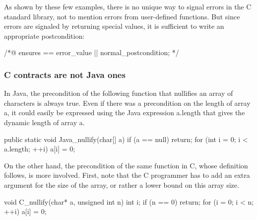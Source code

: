 As shown by these few examples, there is no unique way to signal
errors in the C standard library, not to mention errors from user-defined
functions. But since errors are signaled by returning special values, it
is sufficient to write an appropriate postcondition:

\begin{listing-nonumber}
/*@ ensures \result == error_value || normal_postcondition; */
\end{listing-nonumber}




%


\subsubsection*{C contracts are not Java ones}

In Java, the precondition of the following function that nullifies an
array of characters is always true. Even if there was a precondition
on the length of array {\ttfamily a}, it could easily be expressed using
the Java expression {\ttfamily a.length} that gives the dynamic length
of array {\ttfamily a}.

\begin{listing}{1}
public static void Java_nullify(char[] a) {
  if (a == null) return;
  for (int i = 0; i < a.length; ++i) {
    a[i] = 0;
  }
}
\end{listing}

On the other hand, the precondition of the same function in C, whose
definition follows, is more involved. First, note that the
C programmer has to add an extra argument for the size of the array,
or rather a lower bound on this array size.

\begin{listing}{1}
void C_nullify(char* a, unsigned int n) {
  int i;
  if (n == 0) return;
  for (i = 0; i < n; ++i) {
    a[i] = 0;
  }
}
\end{listing}

